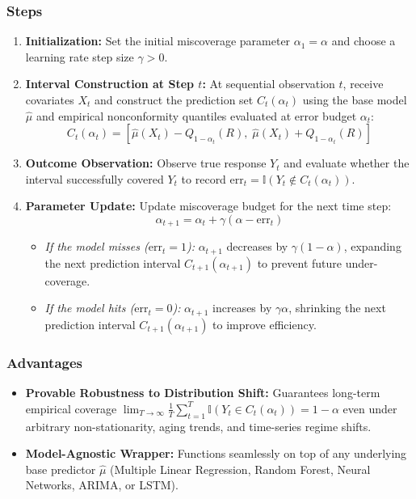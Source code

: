 \documentclass[11pt,a4paper]{article}
\begin{document}
\subsubsection{Steps}
\begin{enumerate}
    \item \textbf{Initialization:} Set the initial miscoverage parameter $\alpha_1 = \alpha$ and choose a learning rate step size $\gamma > 0$.
    \item \textbf{Interval Construction at Step $t$:} At sequential observation $t$, receive covariates $X_t$ and construct the prediction set $C_t(\alpha_t)$ using the base model $\hat{\mu}$ and empirical nonconformity quantiles evaluated at error budget $\alpha_t$:
    \[
    C_t(\alpha_t) = \left[ \hat{\mu}(X_t) - Q_{1-\alpha_t}(R), \; \hat{\mu}(X_t) + Q_{1-\alpha_t}(R) \right]
    \]
    \item \textbf{Outcome Observation:} Observe true response $Y_t$ and evaluate whether the interval successfully covered $Y_t$ to record $\text{err}_t = \mathbb{I}(Y_t \notin C_t(\alpha_t))$.
    \item \textbf{Parameter Update:} Update miscoverage budget for the next time step:
    \[
    \alpha_{t+1} = \alpha_t + \gamma (\alpha - \text{err}_t)
    \]
    \begin{itemize}
        \item \textit{If the model misses ($\text{err}_t = 1$):} $\alpha_{t+1}$ decreases by $\gamma(1 - \alpha)$, expanding the next prediction interval $C_{t+1}(\alpha_{t+1})$ to prevent future under-coverage.
        \item \textit{If the model hits ($\text{err}_t = 0$):} $\alpha_{t+1}$ increases by $\gamma \alpha$, shrinking the next prediction interval $C_{t+1}(\alpha_{t+1})$ to improve efficiency.
    \end{itemize}
\end{enumerate}

\subsubsection{Advantages}
\begin{itemize}
    \item \textbf{Provable Robustness to Distribution Shift:} Guarantees long-term empirical coverage $\lim_{T \to \infty} \frac{1}{T} \sum_{t=1}^T \mathbb{I}(Y_t \in C_t(\alpha_t)) = 1 - \alpha$ even under arbitrary non-stationarity, aging trends, and time-series regime shifts.
    \item \textbf{Model-Agnostic Wrapper:} Functions seamlessly on top of any underlying base predictor $\hat{\mu}$ (Multiple Linear Regression, Random Forest, Neural Networks, ARIMA, or LSTM).
\end{itemize}
\end{document}

